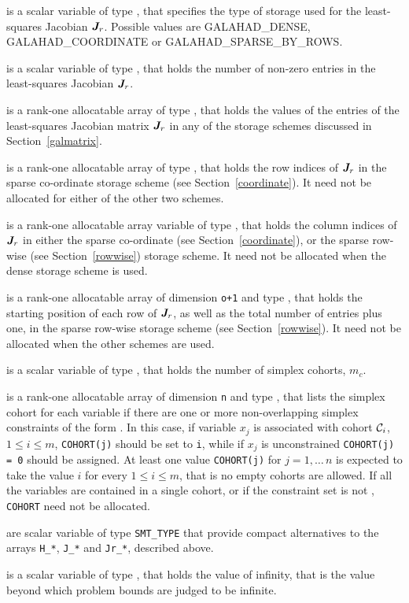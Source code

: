 \documentclass{galahad}
\newcommand{\sym}{\sf\small}
\begin{document}
\begin{description}
 is a scalar variable of type \integer, 
that specifies the type of storage used for the least-squares Jacobian ${\bm{J}}_r$.
Possible values are {\sym GALAHAD\_DENSE}, {\sym GALAHAD\_COORDINATE} 
or {\sym GALAHAD\_SPARSE\_BY\_ROWS}.
              
 is a scalar variable of type \integer, 
that holds the number of non-zero entries in the 
least-squares Jacobian ${\bm{J}}_r$.

 is a rank-one allocatable array of type \realdp, that holds
the values of the entries of the least-squares Jacobian matrix ${\bm{J}}_r$ 
in any of the storage schemes discussed in Section~\ref{galmatrix}.

 is a rank-one allocatable array of type \integer,
that holds the row indices of ${\bm{J}}_r$ in the sparse co-ordinate storage
scheme (see Section~\ref{coordinate}). 
It need not be allocated for either of the other two schemes.

 is a rank-one allocatable array variable of type \integer,
that holds the column indices of ${\bm{J}}_r$ in either the sparse co-ordinate 
(see Section~\ref{coordinate}), or the sparse row-wise 
(see Section~\ref{rowwise}) storage scheme.
It need not be allocated when the dense storage scheme is used.

 is a rank-one allocatable array of dimension {\tt o+1} and type 
\integer, that holds the 
starting position of each row of ${\bm{J}}_r$, as well
as the total number of entries plus one, in the sparse row-wise storage
scheme (see Section~\ref{rowwise}). It need not be allocated when the
other schemes are used.

 is a scalar variable of type \integer, 
 that holds the number of simplex cohorts, $m_c$.

 is a rank-one allocatable array of dimension {\tt n} and type 
 \integer, that lists the simplex cohort for each variable if there are
one or more non-overlapping simplex constraints of the form .
In this case, if variable $x_j$ is associated with cohort $\calC_i$, 
$1 \leq i \leq m$, {\tt COHORT(j)} should be set to {\tt i}, while 
if $x_j$ is unconstrained {\tt COHORT(j) = 0} should be assigned. 
At least one value {\tt COHORT(j)} for $j = 1,\ldots\,n$ is expected to 
take the value $i$ for every $1 \leq i \leq m$, that is no empty cohorts 
are allowed. If all the variables are contained in a single cohort, 
or if the constraint set is not , {\tt COHORT} need not be allocated.

 are scalar variable of type {\tt SMT\_TYPE} that provide
compact alternatives to the arrays {\tt H\_*}, {\tt J\_*} and {\tt Jr\_*}, 
described above.

 is a scalar variable of type \realdp,
that holds the value of infinity, that is the value beyond which
problem bounds are judged to be infinite.

\end{description}
\end{document}
